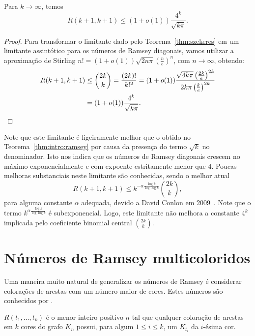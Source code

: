 \begin{corollary}
\label{col:szekeres}
Para $k \to \infty$, temos
\[ \displaystyle R(k+1,k+1) \leq (1+o(1))\frac{4^k}{\sqrt{k \pi}}.\]
\end{corollary}
\begin{proof}
Para transformar o limitante dado pelo Teorema~\ref{thm:szekeres} em um limitante assintótico para os números de Ramsey diagonais, vamos utilizar a aproximação de Stirling $n! = (1+o(1)) \sqrt{2n \pi} \left ( \frac{n}{e} \right)^n $, com $n \to \infty$, obtendo:
\begin{align*}
R(k+1,k+1) &\leq \binom{2k}{k} = \frac{(2k)!}{k!^2} = (1 +o(1)) \frac{\sqrt{4 k \pi} \left ( \frac{2k}{e} \right)^{2k} }{2k\pi \left ( \frac{k}{e} \right)^{2k} } \\
&= (1 +o(1))\frac{4^k}{\sqrt{k\pi}}. \qedhere
\end{align*}
\end{proof}

Note que este limitante é ligeiramente melhor que o obtido no Teorema~\ref{thm:intro:ramsey} por causa da presença do termo $\sqrt{k}$ no denominador. Isto nos indica que os números de Ramsey diagonais crescem no máximo exponencialmente e com expoente estritamente menor que 4. Poucas melhoras substanciais neste limitante são conhecidas, sendo o melhor atual
\[R(k+1,k+1) \leq k^{-\alpha\frac{\log k}{\log \log k}} \binom{2k}{k},\]
para alguma constante $\alpha$ adequada, devido a David Conlon em 2009~\cite{conlon}. Note que o termo $k^{\alpha\frac{\log k}{\log \log k}}$ é subexponencial. Logo, este limitante não melhora a constante $4^k$ implicada pelo coeficiente binomial central $\binom{2k}{k}$.


\section{Números de Ramsey multicoloridos}

Uma maneira muito natural de generalizar os números de Ramsey é considerar colorações de arestas com um número maior de cores. Estes números são conhecidos por .

\begin{definition}
$R(t_1, \dots, t_k)$ é o menor inteiro positivo $n$ tal que qualquer coloração de arestas em $k$ cores do grafo $K_n$ possui, para algum $1 \leq i \leq k$, um $K_{t_i}$ da $i$-ésima cor.
\end{definition}

